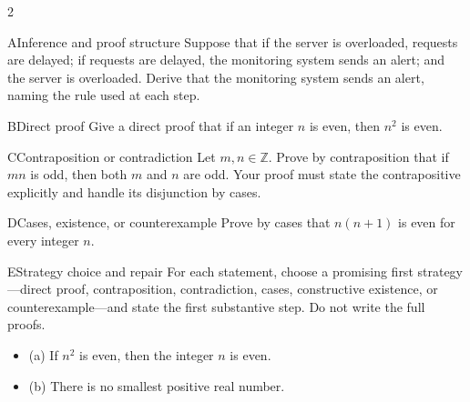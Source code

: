 \documentclass[9pt]{extarticle}
\begin{document}
\begin{multicols}{2}
\begin{CoreProblem}{A}{Inference and proof structure}
Suppose that if the server is overloaded, requests are delayed; if requests are
delayed, the monitoring system sends an alert; and the server is overloaded.
Derive that the monitoring system sends an alert, naming the rule used at each
step.
\end{CoreProblem}
\begin{CoreProblem}{B}{Direct proof}
Give a direct proof that if an integer $n$ is even, then $n^2$ is even.
\end{CoreProblem}
\begin{CoreProblem}{C}{Contraposition or contradiction}
Let $m,n\in\mathbb Z$. Prove by contraposition that if $mn$ is odd, then both
$m$ and $n$ are odd. Your proof must state the contrapositive explicitly and
handle its disjunction by cases.
\end{CoreProblem}
\columnbreak
\begin{CoreProblem}{D}{Cases, existence, or counterexample}
Prove by cases that $n(n+1)$ is even for every integer $n$.
\end{CoreProblem}
\begin{CoreProblem}{E}{Strategy choice and repair}
For each statement, choose a promising first strategy---direct proof,
contraposition, contradiction, cases, constructive existence, or
counterexample---and state the first substantive step. Do not write the full
proofs.
\begin{itemize}
  \item (a) If $n^2$ is even, then the integer $n$ is even.
  \item (b) There is no smallest positive real number.
\end{itemize}
\end{CoreProblem}
\end{multicols}
\CoreWorkArea
\FormBreak
{}
\end{document}
